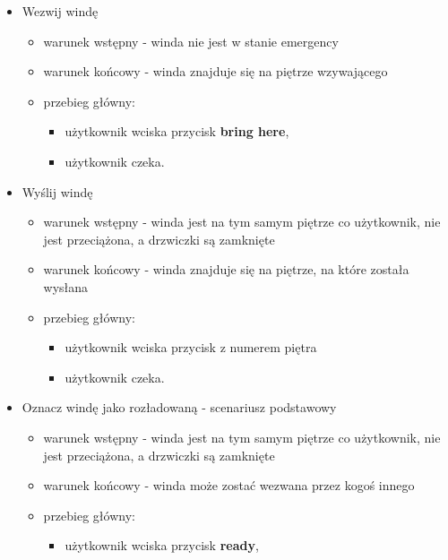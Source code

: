 \documentclass[a4paper,11pt]{article}
\begin{document}
\begin{itemize}
\item Wezwij windę
\begin{itemize}
\item warunek wstępny - winda nie jest w stanie emergency
\item warunek końcowy - winda znajduje się na piętrze wzywającego
\item przebieg główny:
\begin{itemize}
\item użytkownik wciska przycisk \textbf{bring here},
\item użytkownik czeka.
\end{itemize}
\end{itemize}
\item Wyślij windę
\begin{itemize}
\item warunek wstępny - winda jest na tym samym piętrze co użytkownik, nie jest przeciążona, a drzwiczki są zamknięte
\item warunek końcowy - winda znajduje się na piętrze, na które została wysłana
\item przebieg główny:
\begin{itemize}
\item użytkownik wciska przycisk z numerem piętra
\item użytkownik czeka.
\end{itemize}
\end{itemize}
\item Oznacz windę jako rozładowaną - scenariusz podstawowy
\begin{itemize}
\item warunek wstępny - winda jest na tym samym piętrze co użytkownik, nie jest przeciążona, a drzwiczki są zamknięte
\item warunek końcowy - winda może zostać wezwana przez kogoś innego
\item przebieg główny:
\begin{itemize}
\item użytkownik wciska przycisk \textbf{ready},
\end{itemize}
\end{itemize}


\end{itemize}
\end{document}
